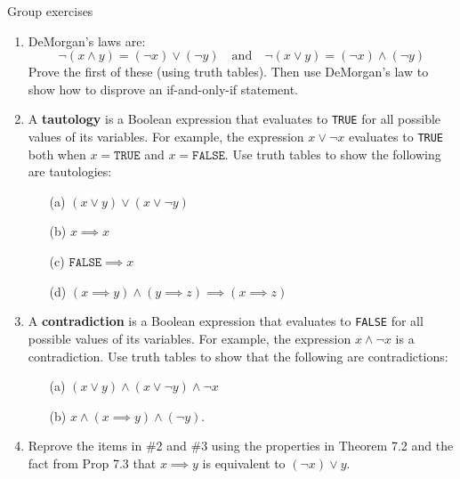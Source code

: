 \documentclass[10pt]{beamer}
\begin{document}
\begin{frame}{Group exercises}
\footnotesize 
\begin{enumerate}
	\item DeMorgan's laws are:
	\[ \lnot (x \land y) = (\lnot x) \lor (\lnot y) \quad \text{and} \quad \lnot (x \lor y) = (\lnot x) \land (\lnot y) \]
	Prove the first of these (using truth tables). Then use DeMorgan's law to show how to disprove an if-and-only-if statement.
	\item A \textbf{tautology} is a Boolean expression that evaluates to \texttt{TRUE} for all possible values of its variables.  For example, the expression $x \lor \lnot x$ evaluates to \texttt{TRUE}  both when $x=\texttt{TRUE}$ and $x=\texttt{FALSE}$.  Use truth tables to show the following are tautologies:
	    \vspace{-0.5cm}
		\begin{enumerate}
		\item[(a)] $(x \lor y) \lor (x \lor \lnot y)$
		\item[(b)] $x \implies x$
		\item[(c)] $\texttt{FALSE} \implies x$
		\item[(d)] $(x \implies y) \land (y \implies z) \implies (x \implies z)$ 
		\end{enumerate}
	\item  A \textbf{contradiction} is a Boolean expression that evaluates to \texttt{FALSE} for all possible values of its variables.  For example, the expression $x \land \lnot x$ is a contradiction.  Use truth tables to show that the following are contradictions:
		\begin{enumerate}
		\item[(a)] $(x \lor y) \land (x \lor \lnot y) \land \lnot x$
		\item[(b)] $x \land (x \implies y) \land (\lnot y)$.
		\end{enumerate}
	\item Reprove the items in \#2 and \#3 using the properties in Theorem 7.2 and the fact  from Prop 7.3 that $x \implies y$ is equivalent to $(\lnot x) \lor y$.
\end{enumerate}
\end{frame}
\end{document}
